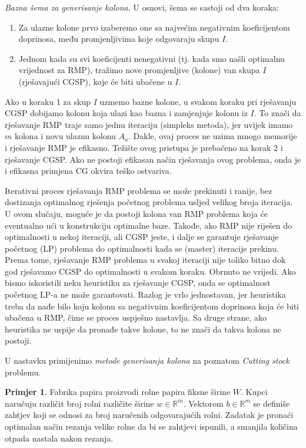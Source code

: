 \documentclass[a4paper, utf8, 11pt, colorlinks]{book}
\theoremstyle{definition}
\newtheorem{primjer}{Primjer}[chapter]
\begin{document}
\emph{Bazna šema za generisanje kolona}. U osnovi, šema se sastoji od dva koraka:
\begin{enumerate}
	\item  Za ulazne kolone prvo izaberemo one sa najvećim negativnim koeficijentom doprinosa, među promjenljivima koje odgovaraju skupu $I$.
	\item Jednom kada su svi koeficijenti nenegativni (tj. kada smo našli optimalnu vrijednost za  RMP), tražimo nove promjenljive (kolone) van skupa $I$ (rješavajući CGSP), koje će biti ubačene u $I$. 
\end{enumerate}
Ako u koraku 1 za skup $I$ uzmemo bazne kolone, u svakom koraku pri rješavanju CGSP dobijamo kolonu koja ulazi kao bazna i zamjenjuje kolonu iz $I$. To znači da rješavanje RMP traje samo jednu iteraciju (simpleks metoda), jer uvijek imamo $m$ kolona i novu ulaznu kolonu $A_a$. Dakle, ovaj proces ne uzima mnogo memorije i rješavanje RMP je efikasno. Težište ovog pristupa je   prebačeno na korak 2 i rješavanje CGSP. Ako ne postoji efikasan način rješavanja ovog problema, onda je i efikasna primjena CG okvira teško ostvariva.  
 

Iterativni proces rješavanja RMP problema se može prekinuti i ranije, bez dostizanja optimalnog rješenja početnog problema usljed velikog broja iteracija. U ovom slučaju, moguće je da postoji kolona van RMP problema koja će eventualno ući u konstrukciju optimalne baze.  Takođe, ako RMP nije riješen do optimalnosti u nekoj iteraciji, ali CGSP jeste, i dalje se garantuje rješavanje početnog (LP) problema do optimalnosti kada se (master) iteracije prekinu. Prema tome, rješavanje RMP problema u svakoj iteraciji nije toliko bitno dok god rješavamo CGSP do optimalnosti u svakom koraku. Obrnuto ne vrijedi.   Ako bismo iskoristili neku heuristiku za rješavanje CGSP, onda se optimalnost početnog LP-a ne može garantovati. Razlog je vrlo jednostavan, jer heuristika treba da nađe bilo koju kolonu sa negativnim koeficijentom doprinosa koja će biti ubačena u RMP, čime se proces uspješno nastavlja. Sa druge strane, ako heuristika ne uspije da pronađe takve kolone, to ne znači da takva kolona ne postoji. 


 U nastavku primijenimo \emph{metode generisanja kolona} na poznatom \emph{Cutting stock} problemu. 
 
\begin{primjer} Fabrika papira proizvodi rolne papira fiksne širine  $W$. 
 Kupci naručuju različit broj rolni različite širine $w \in \mathbb{R}^m$. Vektorom $b \in \mathbb{R}^m$ se definiše zahtjev koji se odnosi za broj naručenih odgovarajućih rolni.  Zadatak je pronaći optimalan način  rezanja velike rolne da bi se zahtjevi ispunili, a smanjila količina otpada nastala nakon rezanja. 
 \end{primjer}
\end{document}
